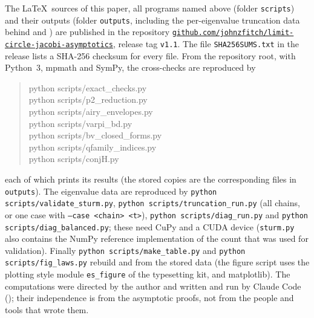 The \LaTeX\ sources of this paper, all programs named above (folder \texttt{scripts}) and their
outputs (folder \texttt{outputs}, including the per-eigenvalue truncation data behind
 and ) are published in the repository
\href{https://github.com/johnzfitch/limit-circle-jacobi-asymptotics}{\texttt{github.com/johnzfitch/limit-circle-jacobi-asymptotics}},
release tag \texttt{v1.1}. The file \texttt{SHA256SUMS.txt} in the release lists a SHA-256 checksum for
every file. From the repository root, with Python~3, mpmath and SymPy, the cross-checks are reproduced by
\begin{quote}\small\ttfamily
python scripts/exact\_checks.py\\
python scripts/p2\_reduction.py\\
python scripts/airy\_envelopes.py\\
python scripts/varpi\_bd.py\\
python scripts/bv\_closed\_forms.py\\
python scripts/qfamily\_indices.py\\
python scripts/conjH.py
\end{quote}
each of which prints its results (the stored copies are the corresponding files in \texttt{outputs}).
The eigenvalue data are reproduced by \texttt{python scripts/validate\_sturm.py},
\texttt{python scripts/truncation\_run.py} (all chains, or one case with
\texttt{--case <chain> <t>}), \texttt{python scripts/diag\_run.py} and
\texttt{python scripts/diag\_balanced.py}; these need CuPy and a CUDA device (\texttt{sturm.py} also
contains the NumPy reference implementation of the count that was used for validation). Finally
\texttt{python scripts/make\_table.py} and \texttt{python scripts/fig\_laws.py} rebuild
 and  from the stored data (the figure script uses the plotting
style module \texttt{es\_figure} of the typesetting kit, and matplotlib). The computations were directed by the author
and written and run by Claude Code (); their independence is from the asymptotic
proofs, not from the people and tools that wrote them.
